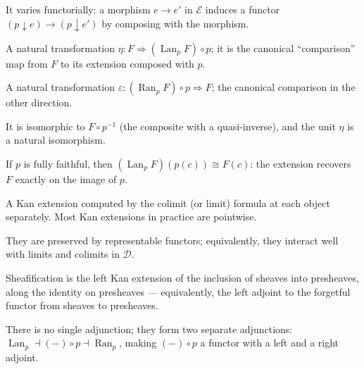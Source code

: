 \begin{exercisesbox}
\begin{qa}
       {It varies functorially: a morphism $e \to e'$ in $\mathcal{E}$ induces a
        functor $(p \downarrow e) \to (p \downarrow e')$ by composing with the morphism.}

       {A natural transformation $\eta : F \Rightarrow (\operatorname{Lan}_p F) \circ p$;
        it is the canonical ``comparison'' map from $F$ to its extension composed with $p$.}

       {A natural transformation $\varepsilon : (\operatorname{Ran}_p F) \circ p \Rightarrow F$;
        the canonical comparison in the other direction.}

       {It is isomorphic to $F \circ p^{-1}$ (the composite with a quasi-inverse),
        and the unit $\eta$ is a natural isomorphism.}

       {If $p$ is fully faithful, then $(\operatorname{Lan}_p F)(p(c)) \cong F(c)$:
        the extension recovers $F$ exactly on the image of $p$.}

       {A Kan extension computed by the colimit (or limit) formula at each object
        separately. Most Kan extensions in practice are pointwise.}

       {They are preserved by representable functors; equivalently, they interact
        well with limits and colimits in $\mathcal{D}$.}

       {Sheafification is the left Kan extension of the inclusion of sheaves into
        presheaves, along the identity on presheaves — equivalently, the left adjoint
        to the forgetful functor from sheaves to presheaves.}

       {There is no single adjunction; they form two separate adjunctions:
        $\operatorname{Lan}_p \dashv (-)\circ p \dashv \operatorname{Ran}_p$,
        making $(-) \circ p$ a functor with a left and a right adjoint.}
\end{qa}
\end{exercisesbox}

